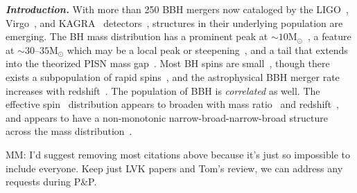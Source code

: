 \documentclass[%
    aps,
    prl,
    reprint,
    superscriptaddress,
    nolongbibliography,
    nobibnotes,
    nofootinbib,
    linenumbers,
    amsmath,amssymb,
]{revtex4-2}
\newcommand{\Msun}{\ensuremath{\mathrm{M}_{\odot}}}
\newcommand{\mm}[1]{{\color{ForestGreen}MM: #1}}
\newcommand{\heading}[1]{\textbf{\textit{#1}}}
\begin{document}
\heading{Introduction.}
With more than 250 \ac{BBH} mergers now cataloged by the LIGO~\cite{LIGOScientific:2014pky}, Virgo~\cite{VIRGO:2014yos}, and KAGRA~\cite{KAGRA:2020tym} detectors~\cite{LIGOScientific:2018mvr, LIGOScientific:2020ibl, LIGOScientific:2021usb, KAGRA:2021vkt, LIGOScientific:2025slb, LIGOScientific:2026wfs}, structures in their underlying population are emerging. The \ac{BH} mass distribution has a prominent peak at $\sim 10\Msun$~\cite{LIGOScientific:2020kqk, Tiwari:2020otp, Edelman:2021zkw, KAGRA:2021duu, Callister:2023tgi, LIGOScientific:2025pvj, LIGOScientific:2026ctl}, a feature at $\sim 30$--$35 \Msun$ which may be a local peak or steepening~\cite{Talbot:2018cva, LIGOScientific:2020kqk, KAGRA:2021duu, Farah:2023vsc, LIGOScientific:2025pvj, LIGOScientific:2026ctl}, and a tail that extends into the theorized \ac{PISN} mass gap~\cite{Barkat:1967zz, Woosley:2016hmi, Tong:2025wpz, Antonini:2025ilj, Ray:2025xti}. Most \ac{BH} spins are small~\cite{Miller:2020zox, Roulet:2021hcu, Callister:2022qwb, Tong:2022iws, KAGRA:2021duu}, though there exists a subpopulation of rapid spins~\cite{Antonini:2024het, Plunkett:2026pxt, Li:2025iux, LIGOScientific:2026ctl}, and the astrophysical \ac{BBH} merger rate increases with redshift~\cite{Fishbach:2018edt, LIGOScientific:2020kqk, KAGRA:2021duu, LIGOScientific:2026ctl}. 
The population of \ac{BBH} is \textit{correlated} as well. The effective spin~\cite{Damour:2001, Racine:2008qv, Ajith:2009bn} distribution appears to broaden with mass ratio~\cite{Callister:2021fpo, Adamcewicz:2022hce, Heinzel:2023hlb, LIGOScientific:2026ctl} and redshift~\cite{Biscoveanu:2022qac, Heinzel:2023hlb}, and appears to have a non-monotonic narrow-broad-narrow-broad structure across the mass distribution~\cite{Antonini:2025ilj, Tong:2025xir, Plunkett:2026pxt, Flanagan:2026ayy, Alvarez-Lopez:2026ymo}.

\mm{I'd suggest removing most citations above because it's just so impossible to include everyone. Keep just LVK papers and Tom's review, we can address any requests during P\&P.}
\end{document}
